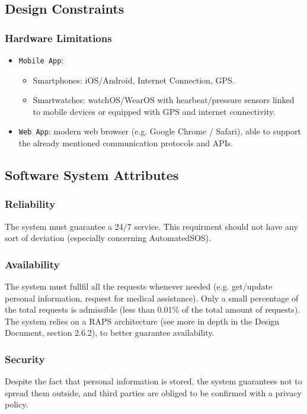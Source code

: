 \documentclass[12pt,a4paper]{article}
\begin{document}
	\newpage
	\subsection{Design Constraints}
	\subsubsection{Hardware Limitations}
		\begin{itemize}
			\item \texttt{Mobile App}: 
				\begin{itemize}
					\item Smartphones: iOS/Android, Internet Connection, GPS.
					\item Smartwatches: watchOS/WearOS with hearbeat/pressure sensors linked to mobile devices or equipped with GPS and internet connectivity.
				\end{itemize}
			\item \texttt{Web App}: modern web browser (e.g. Google Chrome / Safari), able to support the already mentioned communication protocols and APIs.
		\end{itemize}
	

	\subsection{Software System Attributes}
		\subsubsection{Reliability}
		The system must guarantee a 24/7 service. This requirment should not have any sort of deviation (especially concerning AutomatedSOS).
		\subsubsection{Availability}
		The system must fullfil all the requests whenever needed (e.g. get/update personal information, request for medical assistance). Only a small percentage of the total requests is admissible (less than 0.01\% of the total amount of requests). The system relies on a RAPS architecture (see more in depth in the Design Document, section 2.6.2), to better guarantee availability.
		\subsubsection{Security}
		Despite the fact that personal information is stored, the system guarantees not to spread them outside, and third parties are obliged to be confirmed with a privacy policy.
\end{document}
